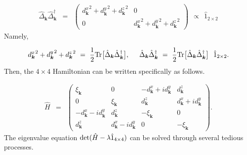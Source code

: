 \documentclass[uplatex,a4j,12pt,dvipdfmx]{jsarticle}
\begin{document}
\begin{eqnarray}
	\hat{\Delta}_{\bm{k}} \hat{\Delta}^{\dagger}_{\bm{k}}
	&=&
	\left(
	\begin{array}{cc}
			{d^{x}_{\bm{k}}}^{2} + {d^{y}_{\bm{k}}}^{2} + {d^{z}_{\bm{k}}}^{2} & 0                                                                  \\[3mm]
			0                                                                  & {d^{x}_{\bm{k}}}^{2} + {d^{y}_{\bm{k}}}^{2} + {d^{z}_{\bm{k}}}^{2}
		\end{array}
	\right)
	\ \ \propto \ \
	\hat{1}_{2 \times 2}
\end{eqnarray}
%
Namely,

\begin{eqnarray}
	{d^{x}_{\bm{k}}}^{2} + {d^{y}_{\bm{k}}}^{2} + {d^{z}_{\bm{k}}}^{2}
	\ = \
	\dfrac{1}{2}
	{\rm Tr} \big[ \hat{\Delta}_{\bm{k}} \hat{\Delta}^{\dagger}_{\bm{k}} \big]
	, \hspace{5mm}
	\hat{\Delta}_{\bm{k}} \hat{\Delta}^{\dagger}_{\bm{k}}
	\ = \
	\dfrac{1}{2}
	{\rm Tr} \big[ \hat{\Delta}_{\bm{k}} \hat{\Delta}^{\dagger}_{\bm{k}} \big]
	\ \
	\hat{1}_{2 \times 2}
	.
\end{eqnarray}
%
Then, the $4 \times 4$ Hamiltonian can be written specifically as follows.

\begin{eqnarray}
	\hat{H}
	&=&
	\left(
	\begin{array}{cccc}
			\xi_{\bm{k}}                        & 0                                 & - d^{x}_{\bm{k}} + i d^{y}_{\bm{k}} & d^{z}_{\bm{k}}                    \\[2mm]
			0                                   & \xi_{\bm{k}}                      & d^{z}_{\bm{k}}                      & d^{x}_{\bm{k}} + i d^{y}_{\bm{k}} \\[2mm]
			- d^{x}_{\bm{k}} - i d^{y}_{\bm{k}} & d^{z}_{\bm{k}}                    & - \xi_{\bm{k}}                      & 0                                 \\[2mm]
			d^{z}_{\bm{k}}                      & d^{x}_{\bm{k}} - i d^{y}_{\bm{k}} & 0                                   & - \xi_{\bm{k}}
		\end{array}
	\right)
	.
\end{eqnarray}
%
The eigenvalue equation ${\rm det}(\hat{H} - \lambda \hat{1}_{4 \times 4})$ can be solved through several tedious processes.
\end{document}
